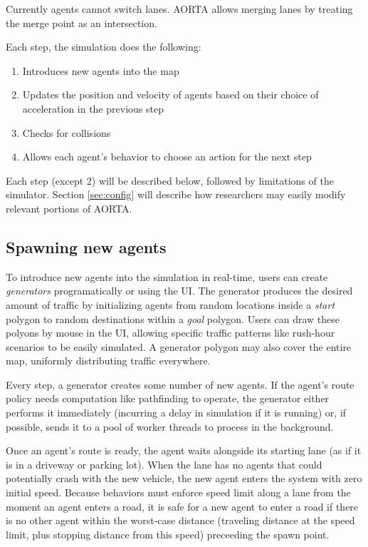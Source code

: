 \documentclass[letterpaper, 10 pt, conference]{ieeeconf}  %
\begin{document}
Currently agents cannot switch lanes. AORTA allows merging lanes by treating
the merge point as an intersection.  

Each step, the simulation does the following:

\begin{enumerate}
  \item Introduces new agents into the map
  \item Updates the position and velocity of agents based on their choice of
        acceleration in the previous step
  \item Checks for collisions
  \item Allows each agent's behavior to choose an action for the next step
\end{enumerate}

Each step (except 2) will be described below, followed by limitations of the
simulator. Section \ref{sec:config} will describe how researchers may easily
modify relevant portions of AORTA.

\subsection{Spawning new agents}

To introduce new agents into the simulation in real-time, users can create
\emph{generators} programatically or using the UI. The generator produces the
desired amount of traffic by initializing agents from random locations inside a
\textit{start} polygon to random destinations within a \textit{goal} polygon.
Users can draw these polyons by mouse in the UI, allowing specific traffic
patterns like rush-hour scenarios to be easily simulated. A generator polygon
may also cover the entire map, uniformly distributing traffic everywhere.

Every step, a generator creates some number of new agents. If the agent's route
policy needs computation like pathfinding to operate, the generator either
performs it immediately (incurring a delay in simulation if it is running) or,
if possible, sends it to a pool of worker threads to process in the background.

Once an agent's route is ready, the agent waits alongside its starting lane (as
if it is in a driveway or parking lot). When the lane has no agents that could
potentially crash with the new vehicle, the new agent enters the system with
zero initial speed. Because behaviors must enforce speed limit along a lane
from the moment an agent enters a road, it is safe for a new agent to enter a
road if there is no other agent within the worst-case distance (traveling
distance at the speed limit, plus stopping distance from this speed) preceeding
the spawn point.%
\end{document}
